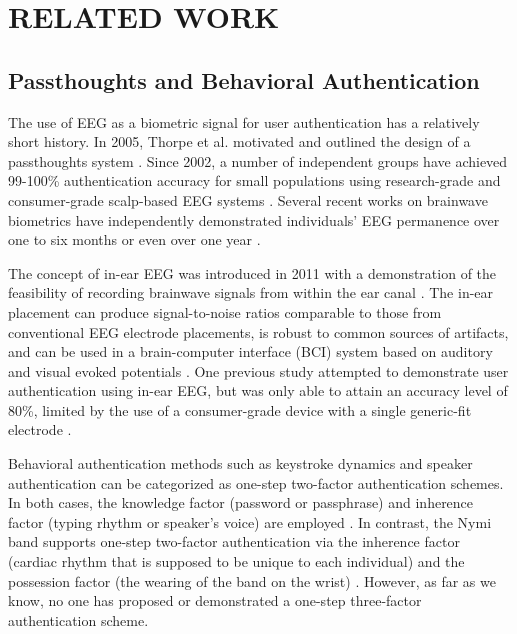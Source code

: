 \documentclass[a4paper,twoside]{article}
\begin{document}
\section{\uppercase{Related Work}}
\label{sec:relatedwork}

\subsection{Passthoughts and Behavioral Authentication}

\noindent The use of EEG as a biometric signal for user authentication has a relatively short history.
In 2005, Thorpe et al. motivated and outlined the design of a passthoughts system \cite{Thorpe2005}.
Since 2002, a number of independent groups have achieved 99-100\% authentication accuracy for small populations using research-grade and consumer-grade scalp-based EEG systems \cite{Poulos2002,Marcel2007a,Ashby2011,Chuang2013b}. Several recent works on brainwave biometrics have independently demonstrated individuals' EEG permanence over one to six months \cite{Armstrong2015,Maiorana2016} or even over one year \cite{Ruiz2017}. 

The concept of in-ear EEG was introduced in 2011 with a demonstration of the feasibility of recording brainwave signals from within the ear canal \cite{Looney2011}. The in-ear placement can produce signal-to-noise ratios comparable to those from conventional EEG electrode placements, is robust to common sources of artifacts, and can be used in a brain-computer interface (BCI) system based on auditory and visual evoked potentials \cite{Kidmose2013a}. One previous study attempted to demonstrate user authentication using in-ear EEG, but was only able to attain an accuracy level of 80\%, limited by the use of a consumer-grade device with a single generic-fit electrode \cite{curran2016passthoughts}.

Behavioral authentication methods such as keystroke dynamics and speaker authentication can be categorized as one-step two-factor authentication schemes. In both cases, the knowledge factor (password or passphrase) and inherence factor (typing rhythm or speaker's voice) are employed \cite{Monrose1997}. In contrast, the Nymi band supports one-step two-factor authentication via the inherence factor (cardiac rhythm that is supposed to be unique to each individual) and the possession factor (the wearing of the band on the wrist) \cite{Nymi}. However, as far as we know, no one has proposed or demonstrated a one-step three-factor authentication scheme.
\end{document}
